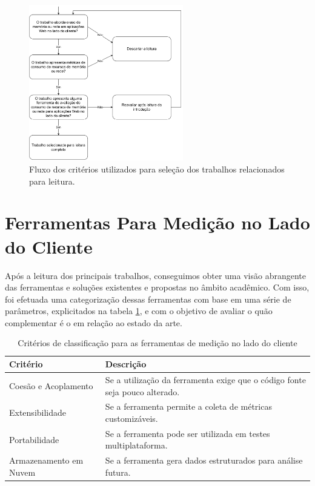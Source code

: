 \documentclass[12pt]{tcc}
\begin{document}
	\begin{figure}[H]
		\centering
		\includegraphics[width=0.6\textwidth]{figures/fluxo-decisao-leitura.pdf}
		\caption{Fluxo dos critérios utilizados para seleção dos trabalhos relacionados para leitura.}
		\label{fig:fluxo-leitura}
	\end{figure}

	\section{Ferramentas Para Medição no Lado do Cliente}
	\label{sec:ferramentas-medicao-clientside}

	Após a leitura dos principais trabalhos, conseguimos obter uma visão abrangente das ferramentas e soluções existentes e propostas no âmbito acadêmico. Com isso, foi efetuada uma categorização dessas ferramentas com base em uma série de parâmetros, explicitados na tabela \ref{tab:criterio-avaliacao-ferramentas}, e com o objetivo de avaliar o quão complementar é o  em relação ao estado da arte.

	\begin{table}[H]
		\centering
		\caption{Critérios de classificação para as ferramentas de medição no lado do cliente}
		\begin{tabular}{lp{8.5cm}}
			\toprule
			\textbf{Critério} & \textbf{Descrição}\\
			\midrule 
			Coesão e Acoplamento & Se a utilização da ferramenta exige que o código fonte seja pouco alterado.\\
			Extensibilidade & Se a ferramenta permite a coleta de métricas customizáveis.\\
			Portabilidade & Se a ferramenta pode ser utilizada em testes multiplataforma.\\
			Armazenamento em Nuvem & Se a ferramenta gera dados estruturados para análise futura.\\
			\bottomrule
		\end{tabular}
		\label{tab:criterio-avaliacao-ferramentas}
	\end{table}
\end{document}

